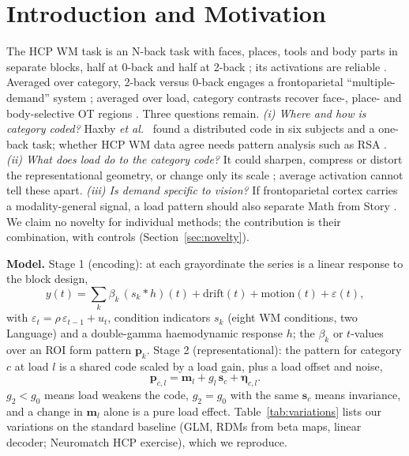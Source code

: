 \documentclass[conference]{IEEEtran}
\begin{document}
\section{Introduction and Motivation}
The HCP WM task is an N-back task with faces, places, tools and body parts in separate blocks, half at 0-back and half at 2-back \cite{vanessen2013,barch2013}; its activations are reliable \cite{drobyshevsky2006,barch2013}. Averaged over category, 2-back versus 0-back engages a frontoparietal ``multiple-demand'' system \cite{duncan2010}; averaged over load, category contrasts recover face-, place- and body-selective OT regions \cite{kanwisher1997,epstein1998,downing2001}. Three questions remain. \emph{(i) Where and how is category coded?} Haxby \emph{et al.}\ \cite{haxby2001} found a distributed code in six subjects and a one-back task; whether HCP WM data agree needs pattern analysis such as RSA \cite{kriegeskorte2008}. \emph{(ii) What does load do to the category code?} It could sharpen, compress or distort the representational geometry, or change only its scale \cite{emrich2013,kriegeskorte2013,bernardi2020}; average activation cannot tell these apart. \emph{(iii) Is demand specific to vision?} If frontoparietal cortex carries a modality-general signal, a load pattern should also separate Math from Story \cite{binder2011}. We claim no novelty for individual methods; the contribution is their combination, with controls (Section~\ref{sec:novelty}).

\textbf{Model.} Stage 1 (encoding): at each grayordinate the series is a linear response to the block design,
\begin{equation}
y(t)=\sum_{k}\beta_k\,(s_k\ast h)(t)+\text{drift}(t)+\text{motion}(t)+\varepsilon(t),
\label{eq:glm}
\end{equation}
with $\varepsilon_t=\rho\,\varepsilon_{t-1}+u_t$, condition indicators $s_k$ (eight WM conditions, two Language) and a double-gamma haemodynamic response $h$; the $\beta_k$ or $t$-values over an ROI form pattern $\mathbf{p}_k$. Stage 2 (representational): the pattern for category $c$ at load $l$ is a shared code scaled by a load gain, plus a load offset and noise,
\begin{equation}
\mathbf{p}_{c,l}=\mathbf{m}_l+g_l\,\mathbf{s}_c+\boldsymbol{\eta}_{c,l}.
\label{eq:rep}
\end{equation}
$g_2<g_0$ means load weakens the code, $g_2=g_0$ with the same $\mathbf{s}_c$ means invariance, and a change in $\mathbf{m}_l$ alone is a pure load effect. Table~\ref{tab:variations} lists our variations on the standard baseline (GLM, RDMs from beta maps, linear decoder; Neuromatch HCP exercise), which we reproduce.
\end{document}
